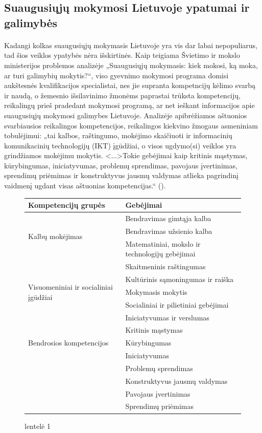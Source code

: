 \documentclass[12pt,a4paper, titlepage]{article}
\begin{document}
\subsection{Suaugusiųjų mokymosi Lietuvoje ypatumai ir galimybės}
\paragraph{}
	Kadangi kolkas suaugusiųjų mokymasis Lietuvoje yra vis dar labai nepopuliarus, tad šios veiklos ypatybės nėra išskirtinės. Kaip teigiama Švietimo ir mokslo ministerijos problemos analizėje „Suaugusiųjų mokymasis: kiek mokosi, ką moka, ar turi galimybių mokytis?“, viso gyevnimo mokymosi programa domisi aukštesnės kvalifikacijos specialistai, nes jie supranta kompetncijų kėlimo svarbą ir naudą, o žemesnio išsilavinimo žmonėms paprastai trūksta kompetencijų, reikalingų prieš pradedant mokymosi programą, ar net ieškant informacijos apie suaugusiųjų mokymosi galimybes Lietuvoje. Analizėje apibrėžiamos aštuonios svarbiausios reikalingos kompetencijos, reikalingos kiekvino žmogaus asmeniniam tobulėjimui: „tai kalbos, raštingumo, mokėjimo skaičiuoti ir informacinių komunikacinių technologijų (IKT) įgūdžiai, o visos ugdymo(si) veiklos yra grindžiamos mokėjimu mokytis. <...>Tokie gebėjimai kaip kritinis mąstymas, kūrybingumas, iniciatyvumas, problemų sprendimas, pavojaus įvertinimas, sprendimų priėmimas ir konstruktyvus jausmų valdymas atlieka pagrindinį vaidmenį ugdant visas aštuonias kompetencijas.“ (\cite{Zablacke2015}).

\begin{figure}[H]
\begin{tabular}{ |l|l| } 
\hline
Kompetencijų grupės & Gebėjimai  \\
\hline
\multirow{3}{8em}{Kalbų mokėjimas} & Bendravimas gimtąja kalba \\ 
& Bendravimas užsienio kalba \\ 
\hline
\multirow{3}{10em}{Informaciniai gebėjimai} & Matematiniai, mokslo ir
technologijų gebėjimai \\ 
& Skaitmeninis
raštingumas  \\ 
\hline
\multirow{3}{12em}{Visuomeniniai ir socialiniai įgūdžiai} & Kultūrinis sąmoningumas ir raiška \\ 
& Mokymasis mokytis\\ 
& Socialiniai ir
pilietiniai
gebėjimai\\
& Iniciatyvumas ir
verslumas\\
\hline
\multirow{3}{12em}{Bendrosios kompetencijos} & Kritinis mąstymas \\ 
& Kūrybingumas\\ 
&Iniciatyvumas\\
&Problemų sprendimas\\
&Konstruktyvus jausmų valdymas\\
&Pavojaus įvertinimas\\
&Sprendimų priėmimas\\
\hline
\end{tabular}
\caption{lentelė 1}
\end{figure}
\end{document}
